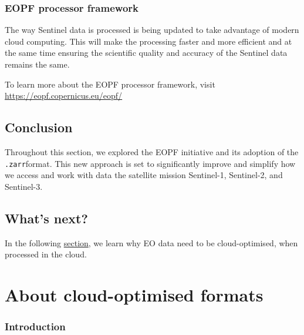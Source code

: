 \documentclass[
  letterpaper,
  DIV=11,
  numbers=noendperiod]{scrreprt}
\begin{document}
\subsection{EOPF processor framework}\label{eopf-processor-framework}

The way Sentinel data is processed is being updated to take advantage of
modern cloud computing. This will make the processing faster and more
efficient and at the same time ensuring the scientific quality and
accuracy of the Sentinel data remains the same.

\begin{tcolorbox}[enhanced jigsaw, coltitle=black, colback=white, leftrule=.75mm, colbacktitle=quarto-callout-note-color!10!white, titlerule=0mm, title=\textcolor{quarto-callout-note-color}{\faInfo}\hspace{0.5em}{Note}, rightrule=.15mm, bottomrule=.15mm, bottomtitle=1mm, toptitle=1mm, arc=.35mm, toprule=.15mm, left=2mm, opacityback=0, colframe=quarto-callout-note-color-frame, opacitybacktitle=0.6, breakable]

To learn more about the EOPF processor framework, visit
\url{https://eopf.copernicus.eu/eopf/}

\end{tcolorbox}

\section{Conclusion}\label{conclusion}

Throughout this section, we explored the EOPF initiative and its
adoption of the \texttt{.zarr}format. This new approach is set to
significantly improve and simplify how we access and work with data the
satellite mission Sentinel-1, Sentinel-2, and Sentinel-3.

\section{What's next?}\label{whats-next}

In the following \href{./12_about_cloudoptimized_formats.qmd}{section},
we learn why EO data need to be cloud-optimised, when processed in the
cloud.

\chapter{About cloud-optimised
formats}\label{about-cloud-optimised-formats}

\subsection{Introduction}\label{introduction-1}
\end{document}
